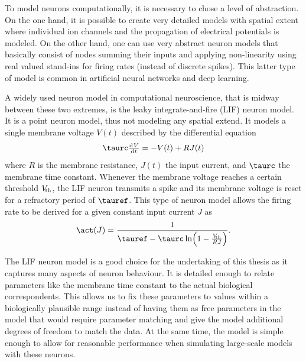 To model neurons computationally, it is necessary to chose a level of abstraction.
On the one hand, it is possible to create very detailed models with spatial extent \parencite[e.g.,][]{markram2015,bahl2012} where individual ion channels and the propagation of electrical potentials is modeled.
On the other hand, one can use very abstract neuron models that basically consist of nodes summing their inputs and applying non-linearity using real valued stand-ins for firing rates (instead of discrete spikes).
This latter type of model is common in artificial neural networks and deep learning.

A widely used neuron model in computational neuroscience, that is midway between these two extremes, is the leaky integrate-and-fire (LIF) neuron model.
It is a point neuron model, thus not modeling any spatial extend.
It models a single membrane voltage $V(t)$ described by the differential equation
\begin{equation}
    \taurc \od{V}{t} = -V(t) + R J(t)
\end{equation}
where $R$ is the membrane resistance, $J(t)$ the input current, and $\taurc$ the membrane time constant.
Whenever the membrane voltage reaches a certain threshold $V_{\!{\mathrm{th}}}$, the LIF neuron transmits a spike and its membrane voltage is reset for a refractory period of $\tauref$.
This type of neuron model allows the firing rate to be derived for a given constant input current $J$ as
\begin{equation}
    \act(J) = \frac{1}{\tauref - \taurc \ln\!\del{1 - \frac{V_{\!\ped{th}}}{R J}}} \text{.}
\end{equation}

The LIF neuron model is a good choice for the undertaking of this thesis as it captures many aspects of neuron behaviour.
It is detailed enough to relate parameters like the membrane time constant to the actual biological correspondents.
This allows us to fix these parameters to values within a biologically plausible range instead of having them as free parameters in the model that would require parameter matching and give the model additional degrees of freedom to match the data.
At the same time, the model is simple enough to allow for reasonable performance when simulating large-scale models with these neurons.
